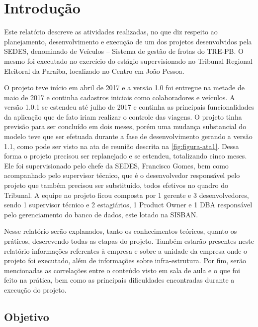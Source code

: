 
\chapter{Introdução}
\label{chap:introducao}

Este relatório descreve as atividades realizadas, no que diz respeito ao planejamento, desenvolvimento e execução de um dos projetos desenvolvidos pela SEDES, denominado de Veículos – Sistema de gestão de frotas do TRE-PB. O mesmo foi executado no exercício do estágio supervisionado no Tribunal Regional Eleitoral da Paraíba, localizado no Centro em João Pessoa.

O projeto teve início em abril de 2017 e a versão 1.0 foi entregue na metade de maio de 2017 e continha cadastros iniciais como colaboradores e veículos. A versão 1.0.1 se estendeu até julho de 2017 e continha as principais funcionalidades da aplicação que de fato iriam realizar o controle das viagens. O projeto tinha previsão para ser concluído em dois meses, porém uma mudança substancial do modelo teve que ser efetuada durante a fase de desenvolvimento gerando a versão 1.1, como pode ser visto na ata de reunião descrita na \autoref{fig:figura-ata1}. Dessa forma o projeto precisou ser replanejado e se estendeu, totalizando cinco meses. Ele foi supervisionado pelo chefe da SEDES, Francisco Gomes, bem como acompanhado pelo supervisor técnico, que é o desenvolvedor responsável pelo projeto que também precisou ser substituído, todos efetivos no quadro do Tribunal. A equipe no projeto ficou composta por 1 gerente e 3 desenvolvedores, sendo 1 supervisor técnico e 2 estagiários, 1 Product Owner e 1 DBA responsável pelo gerenciamento do banco de dados, este lotado na SISBAN.

Nesse relatório serão explanados, tanto os conhecimentos teóricos, quanto os práticos, descrevendo todas as etapas do projeto. Também estarão presentes neste relatório informações referentes à empresa e sobre a unidade da empresa onde o projeto foi executado, além de informações sobre infra-estrutura.
Por fim, serão mencionadas as correlações entre o conteúdo visto em sala de aula e o que foi feito na prática, bem como as principais dificuldades encontradas durante a execução do projeto.


\section{Objetivo}
\label{sec:objetivo}

